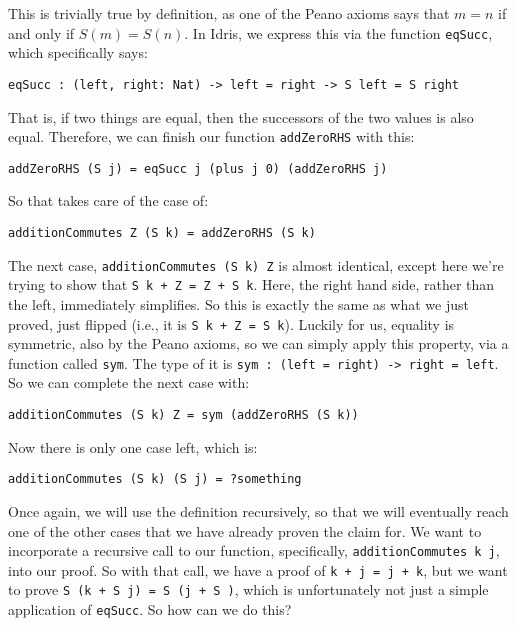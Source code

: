 \documentclass{article}
\newcommand{\inline}[1]{\texttt{#1}}
\begin{document}
This is trivially true by definition, as one of the Peano axioms says that $m=n$ if and only if $S(m)=S(n)$.
In Idris, we express this via the function \inline{eqSucc}, which specifically says:

\begin{verbatim}
eqSucc : (left, right: Nat) -> left = right -> S left = S right
\end{verbatim}

That is, if two things are equal, then the successors of the two values is also equal.
Therefore, we can finish our function \inline{addZeroRHS} with this:

\begin{verbatim}
addZeroRHS (S j) = eqSucc j (plus j 0) (addZeroRHS j)
\end{verbatim}

So that takes care of the case of:

\begin{verbatim}
additionCommutes Z (S k) = addZeroRHS (S k)
\end{verbatim}

The next case, \inline{additionCommutes (S k) Z} is almost identical, except here we’re trying to show that \inline{S k + Z = Z + S k}.
Here, the right hand side, rather than the left, immediately simplifies.
So this is exactly the same as what we just proved, just flipped (i.e., it is \inline{S k + Z = S k}).
Luckily for us, equality is symmetric, also by the Peano axioms, so we can simply apply this property, via a function called \inline{sym}.
The type of it is \inline{sym : (left = right) -> right = left}.
So we can complete the next case with:

\begin{verbatim}
additionCommutes (S k) Z = sym (addZeroRHS (S k))
\end{verbatim}

Now there is only one case left, which is:

\begin{verbatim}
additionCommutes (S k) (S j) = ?something
\end{verbatim}

Once again, we will use the definition recursively, so that we will eventually reach one of the other cases that we have already proven the claim for.
We want to incorporate a recursive call to our function, specifically, \inline{additionCommutes k j}, into our proof.
So with that call, we have a proof of \inline{k + j = j + k}, but we want to prove \inline{S (k + S j) = S (j + S )}, which is unfortunately not just a simple application of \inline{eqSucc}.
So how can we do this?
\end{document}
